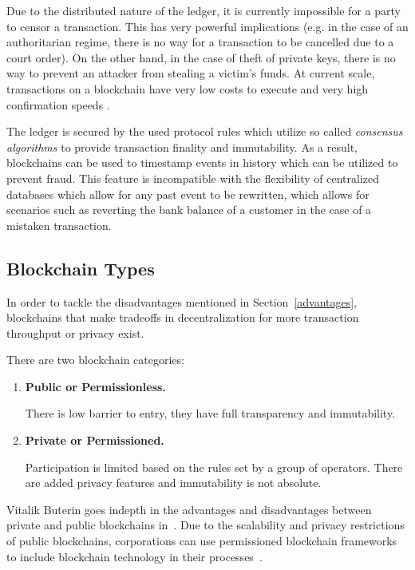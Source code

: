 Due to the distributed nature of the ledger, it is currently impossible for a party to censor a transaction. This has very powerful implications (e.g. in the case of an authoritarian regime, there is no way for a transaction to be cancelled due to a court order). On the other hand, in the case of theft of private keys, there is no way to prevent an attacker from stealing a victim's funds.  At current scale, transactions on a blockchain have very low costs to execute and very high confirmation speeds \cite{ethpricestats}.

The ledger is secured by the used protocol rules which utilize so called \textit{consensus algorithms} to provide transaction finality and immutability. As a result, blockchains can be used to timestamp events in history \cite{ots} which can be utilized to prevent fraud. This feature is incompatible with the flexibility of centralized databases which allow for any past event to be rewritten, which allows for scenarios such as reverting the bank balance of a customer in the case of a mistaken transaction. 

\subsection{Blockchain Types}
In order to tackle the disadvantages mentioned in Section~\ref{advantages}, blockchains that make tradeoffs in decentralization for more transaction throughput or privacy exist. 


There are two blockchain categories:
\begin{enumerate}
    \item \textbf{Public or Permissionless.} 
    
    There is low barrier to entry, they have full transparency and immutability.
    \item \textbf{Private or Permissioned.} 
    
    Participation is limited based on the rules set by a group of operators. There are added privacy features and immutability is not absolute. 
\end{enumerate}

Vitalik Buterin goes indepth in the advantages and disadvantages between private and public blockchains in~\cite{publicprivate}. Due to the scalability and privacy restrictions of public blockchains, corporations can use permissioned blockchain frameworks to include blockchain technology in their processes~\cite{quorum, hyperledger, r3}.

